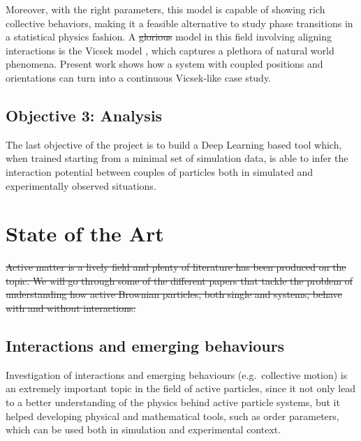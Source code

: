 \documentclass[../../master_thesis_np.tex]{subfiles}
\begin{document}
	Moreover, with the right parameters, this model is capable of showing rich collective behaviors, making it a feasible alternative to study phase transitions in a statistical physics fashion. 
	A \sout{glorious} model in this field involving aligning interactions is the Vicsek model \cite{vicsek_novel_1995}, which captures a plethora of natural world phenomena. 
	Present work shows how a system with coupled positions and orientations can turn into a continuous Vicsek-like case study.
	
	\subsection{Objective 3: Analysis} 
	The last objective of the project is to build a Deep Learning based tool which, when trained starting from a minimal set of simulation data, is able to infer the interaction potential between couples of particles both in simulated and experimentally observed situations.
	

	\section{State of the Art} \label{literature}
	
	\sout{Active matter is a lively field and plenty of literature has been produced on the topic. We will go through some of the  different papers that tackle the problem of understanding how active Brownian particles, both single and systems, behave with and without interactions.}
	
	\subsection{Interactions and emerging behaviours}
	Investigation of interactions and emerging behaviours (e.g.\ collective motion) is an extremely important topic in the field of active particles, since it not only lead to a better understanding of the physics behind active particle systems, but it helped developing physical and mathematical tools, such as order parameters, which can be used both in simulation and experimental context. 
	
\end{document}
